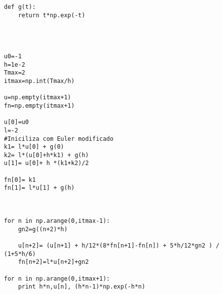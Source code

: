 \begin{resol}
\begin{verbatim}
def g(t):
	return t*np.exp(-t)




u0=-1
h=1e-2
Tmax=2
itmax=np.int(Tmax/h)

u=np.empty(itmax+1)
fn=np.empty(itmax+1)

u[0]=u0
l=-2
#Iniciliza com Euler modificado
k1= l*u[0] + g(0)
k2= l*(u[0]+h*k1) + g(h)
u[1]= u[0]+ h *(k1+k2)/2

fn[0]= k1
fn[1]= l*u[1] + g(h)



for n in np.arange(0,itmax-1):
	gn2=g((n+2)*h)
	
	u[n+2]= (u[n+1] + h/12*(8*fn[n+1]-fn[n]) + 5*h/12*gn2 ) / (1+5*h/6)
	fn[n+2]=l*u[n+2]+gn2

for n in np.arange(0,itmax+1):
	print h*n,u[n], (h*n-1)*np.exp(-h*n)
\end{verbatim}


\fi
 
\end{resol}




